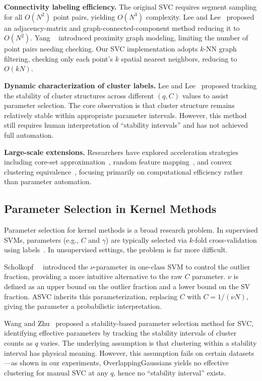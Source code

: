 \textbf{Connectivity labeling efficiency.} The original SVC requires segment sampling for all $O(N^2)$ point pairs, yielding $O(N^3)$ complexity. Lee and Lee~\cite{lee2005} proposed an adjacency-matrix and graph-connected-component method reducing it to $O(N^2)$. Yang \etal~\cite{yang2002} introduced proximity graph modeling, limiting the number of point pairs needing checking. Our SVC implementation adopts $k$-NN graph filtering, checking only each point's $k$ spatial nearest neighbors, reducing to $O(kN)$.

\textbf{Dynamic characterization of cluster labels.} Lee and Lee~\cite{lee2007} proposed tracking the stability of cluster structures across different $(q,C)$ values to assist parameter selection. The core observation is that cluster structure remains relatively stable within appropriate parameter intervals. However, this method still requires human interpretation of ``stability intervals'' and has not achieved full automation.

\textbf{Large-scale extensions.} Researchers have explored acceleration strategies including core-set approximation~\cite{tsang2006}, random feature mapping~\cite{rahimi2008}, and convex clustering equivalence~\cite{hofmann2008}, focusing primarily on computational efficiency rather than parameter automation.

\subsection{Parameter Selection in Kernel Methods}

Parameter selection for kernel methods is a broad research problem. In supervised SVMs, parameters (e.g., $C$ and $\gamma$) are typically selected via $k$-fold cross-validation using labels~\cite{scholkopf2002}. In unsupervised settings, the problem is far more difficult.

Scholkopf~\etal~\cite{scholkopf2001} introduced the $\nu$-parameter in one-class SVM to control the outlier fraction, providing a more intuitive alternative to the raw $C$ parameter. $\nu$ is defined as an upper bound on the outlier fraction and a lower bound on the SV fraction. ASVC inherits this parameterization, replacing $C$ with $C=1/(\nu N)$, giving the parameter a probabilistic interpretation.

Wang and Zhu~\cite{wang2008} proposed a stability-based parameter selection method for SVC, identifying effective parameters by tracking the stability intervals of cluster counts as $q$ varies. The underlying assumption is that clustering within a stability interval has physical meaning. However, this assumption fails on certain datasets---as shown in our experiments, OverlappingGaussians yields no effective clustering for manual SVC at any $q$, hence no ``stability interval'' exists.

